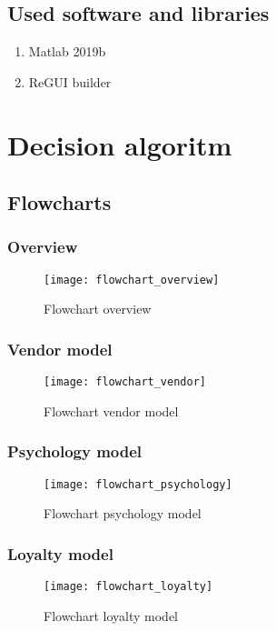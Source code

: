 \subsection{Used software and libraries} \label{subsec:libraries}
\begin{enumerate}
    \item Matlab 2019b
    \item ReGUI builder
\end{enumerate}
\section{Decision algoritm}
\subsection{Flowcharts}
\subsubsection{Overview}
\begin{figure}[h!]
    \begin{center}
        \texttt{[image: flowchart\_overview]}
    \end{center}
    \caption{Flowchart overview}
    \label{flowchart_overview}
\end{figure}
\newpage
\subsubsection{Vendor model}
\begin{figure}[h!]
    \begin{center}
        \texttt{[image: flowchart\_vendor]}
    \end{center}
    \caption{Flowchart vendor model}
    \label{flowchart_vendor}
\end{figure}
\subsubsection{Psychology model}
\begin{figure}[h!]
    \begin{center}
        \texttt{[image: flowchart\_psychology]}
    \end{center}
    \caption{Flowchart psychology model}
    \label{flowchart_psychology}
\end{figure}
\newpage
\subsubsection{Loyalty model}
\begin{figure}[h!]
    \begin{center}
        \texttt{[image: flowchart\_loyalty]}
    \end{center}
    \caption{Flowchart loyalty model}
    \label{flowchart_loyalty}
\end{figure}
